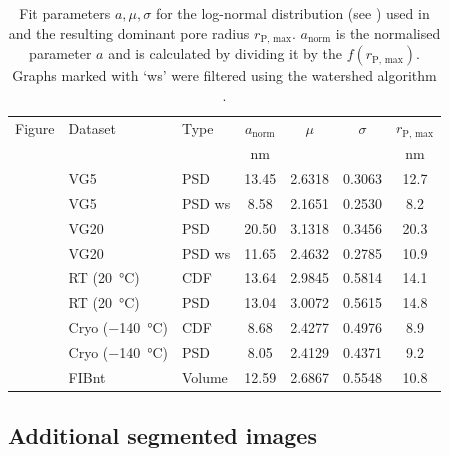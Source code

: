 \begin{table}[htbp]
    \centering
    \caption{
		Fit parameters $a, \mu, \sigma$ for the log-normal distribution (see ) used in  and the resulting dominant pore radius $r_\text{P, max}$.
		$a_\text{norm}$ is the normalised parameter $a$ and is calculated by dividing it by the $f(r_\text{P, max})$.
		Graphs marked with `ws' were filtered using the watershed algorithm \cite{beucher.1992}.
	}
	\label{tab:rP_fit_parameters}
    \begin{tabularx}{\linewidth}{l X l S[table-format=2.2] S[table-format=1.4] S[table-format=1.4] S[table-format=2.2]}
        \toprule
        Figure & Dataset & Type & {$a_\text{norm}$} & {$\mu$} & {$\sigma$} & {$r_\text{P, max}$} \\
         &  &  & {\unit{\nano\meter}} &  &  & {\unit{\nano\meter}} \\
        \midrule
         & \ac{VG5} & \ac{PSD} & 13.45 & 2.6318 & 0.3063 & 12.7 \\
         & \ac{VG5} & \ac{PSD} ws & 8.58 & 2.1651 & 0.2530 & 8.2 \\
         & \ac{VG20} & \ac{PSD} & 20.50 & 3.1318 & 0.3456 & 20.3 \\
         & \ac{VG20} & \ac{PSD} ws & 11.65 & 2.4632 & 0.2785 & 10.9 \\
        \midrule
         & RT (\qty{20}{\celsius}) & \ac{CDF} & 13.64 & 2.9845 & 0.5814 & 14.1 \\
         & RT (\qty{20}{\celsius}) & \ac{PSD} & 13.04 & 3.0072 & 0.5615 & 14.8 \\
         & Cryo (\qty{-140}{\celsius}) & \ac{CDF} & 8.68 & 2.4277 & 0.4976 & 8.9 \\
         & Cryo (\qty{-140}{\celsius}) & \ac{PSD} & 8.05 & 2.4129 & 0.4371 & 9.2 \\
         & \ac{FIBnt} & Volume & 12.59 & 2.6867 & 0.5548 & 10.8 \\
        \bottomrule
    \end{tabularx}
\end{table}

\newpage
\subsection{Additional segmented images}
\label{subsec:appendix_PSD_arbib}

